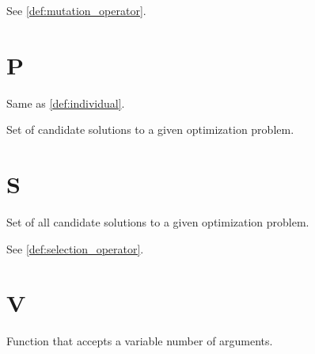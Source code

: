     \begin{Definition}[Mutator]
    \label{def:mutator}
      See \vref{def:mutation_operator}.
    \end{Definition}

  \section*{P}
    \begin{Definition}[Phenotype]
    \label{def:phenotype}
      Same as \vref{def:individual}.
    \end{Definition}

    \begin{Definition}[Population]
    \label{def:population}
      Set of candidate solutions to a given optimization problem.
    \end{Definition}

  \section*{S}
    \begin{Definition}
    \label{def:search_space}
      Set of all candidate solutions to a given optimization problem.
    \end{Definition}

    \begin{Definition}[Selector]
      See \vref{def:selection_operator}.
    \end{Definition}

  \section*{V}
    \begin{Definition}
    \label{def:variadic_function}
      Function that accepts a variable number of arguments.  
    \end{Definition}
